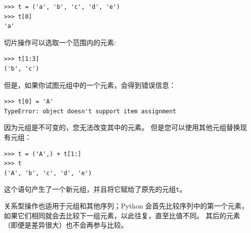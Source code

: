 
\begin{lstlisting}
>>> t = ('a', 'b', 'c', 'd', 'e')
>>> t[0]
'a'
\end{lstlisting}
%

切片操作可以选取一个范围内的元素:
  
  
  
  

\begin{lstlisting}
>>> t[1:3]
('b', 'c')
\end{lstlisting}
%

但是，如果你试图元组中的一个元素，会得到错误信息：

  
  

\begin{lstlisting}
>>> t[0] = 'A'
TypeError: object doesn't support item assignment
\end{lstlisting}

%

因为元组是不可变的，您无法改变其中的元素。 但是您可以使用其他元组替换现有元组：

\begin{lstlisting}
>>> t = ('A',) + t[1:]
>>> t
('A', 'b', 'c', 'd', 'e')
\end{lstlisting}
%

这个语句产生了一个新元组，并且将它赋给了原先的元组\lstinline{t}。


关系型操作也适用于元组和其他序列；Python 会首先比较序列中的第一个元素，如果它们相同就会去比较下一组元素，以此往复，直至比值不同。 其后的元素（即便是差异很大）也不会再参与比较。


